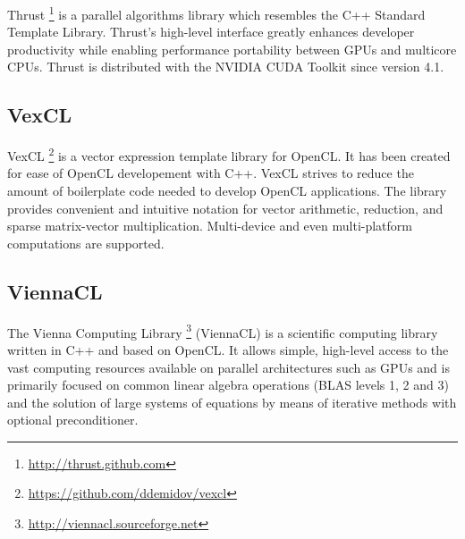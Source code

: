 \documentclass[1p]{elsarticle}
\begin{document}
Thrust%
\footnote{\href{http://thrust.github.com}{http://thrust.github.com}}
is a parallel algorithms library which resembles the C++ Standard Template
Library. Thrust's high-level interface greatly enhances developer
productivity while enabling performance portability between GPUs and multicore
CPUs. Thrust is distributed with the NVIDIA CUDA Toolkit since version 4.1.

\subsection{VexCL}

VexCL%
\footnote{\href{https://github.com/ddemidov/vexcl}{https://github.com/ddemidov/vexcl}}
is a vector expression template library for OpenCL. It has been created for ease
of OpenCL developement with C++.  VexCL strives to reduce the amount of boilerplate
code needed to develop OpenCL applications. The library provides convenient and
intuitive notation for vector arithmetic, reduction, and sparse matrix-vector
multiplication. Multi-device and even multi-platform computations are
supported. 

\subsection{ViennaCL}

The Vienna Computing Library%
\footnote{\href{http://viennacl.sourceforge.net}{http://viennacl.sourceforge.net}}
(ViennaCL) is a scientific computing library written in C++ and based on
OpenCL. It allows simple, high-level access to the vast computing resources
available on parallel architectures such as GPUs and is primarily focused on
common linear algebra operations (BLAS levels 1, 2 and 3) and the solution of
large systems of equations by means of iterative methods with optional
preconditioner.
\end{document}
